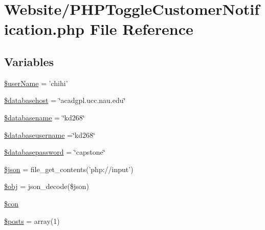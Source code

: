 \hypertarget{_p_h_p_toggle_customer_notification_8php}{\section{Website/\-P\-H\-P\-Toggle\-Customer\-Notification.php File Reference}
\label{_p_h_p_toggle_customer_notification_8php}
}
\subsection*{Variables}
\begin{DoxyCompactItemize}
\item 
\hyperlink{_p_h_p_toggle_customer_notification_8php_aff20833df389a26c0f9384512eec4a68}{\$user\-Name} = 'chihi'
\item 
\hyperlink{_p_h_p_toggle_customer_notification_8php_a034ead57b6864a4413371711e8d65372}{\$databasehost} = \char`\"{}acadgpl.\-ucc.\-nau.\-edu\char`\"{}
\item 
\hyperlink{_p_h_p_toggle_customer_notification_8php_aace53f8afce81b52040cef0cd850138a}{\$databasename} = \char`\"{}kd268\char`\"{}
\item 
\hyperlink{_p_h_p_toggle_customer_notification_8php_a251bf75f510d7c8b556c65d7c30e911f}{\$databaseusername} =\char`\"{}kd268\char`\"{}
\item 
\hyperlink{_p_h_p_toggle_customer_notification_8php_a1a07536b6a5f43f2d8f826bd2ee6c91a}{\$databasepassword} = \char`\"{}capstone\char`\"{}
\item 
\hyperlink{_p_h_p_toggle_customer_notification_8php_acedd13b51401130848ce18f4d5c52605}{\$json} = file\-\_\-get\-\_\-contents('php\-://input')
\item 
\hyperlink{_p_h_p_toggle_customer_notification_8php_a9008ed94ba185855b1723e367744b87e}{\$obj} = json\-\_\-decode(\$json)
\item 
\hyperlink{_p_h_p_toggle_customer_notification_8php_a0debe10448ec56a57b5509648408a549}{\$con}
\item 
\hyperlink{_p_h_p_toggle_customer_notification_8php_a9f4cad5a721e7f7711fba0bf0f7ec273}{\$posts} = array(1)
\end{DoxyCompactItemize}


